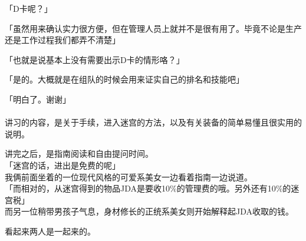 「D卡呢？」

「虽然用来确认实力很方便，但在管理人员上就并不是很有用了。毕竟不论是生产还是工作过程我们都弄不清楚」

「也就是说基本上没有需要出示D卡的情形咯？」

「是的。大概就是在组队的时候会用来证实自己的排名和技能吧」

「明白了。谢谢」\\

\sqsplit\\

讲习的内容，是关于手续，进入迷宫的方法，以及有关装备的简单易懂且很实用的说明。

讲完之后，是指南阅读和自由提问时间。\\

「迷宫的话，进出是免费的呢」\\

我俩前面坐着的一位现代风格的可爱系美女一边看着指南一边说道。\\

「而相对的，从迷宫得到的物品JDA是要收10\%的管理费的哦。另外还有10\%的迷宫税」\\

而另一位稍带男孩子气息，身材修长的正统系美女则开始解释起JDA收取的钱。

看起来两人是一起来的。\\

